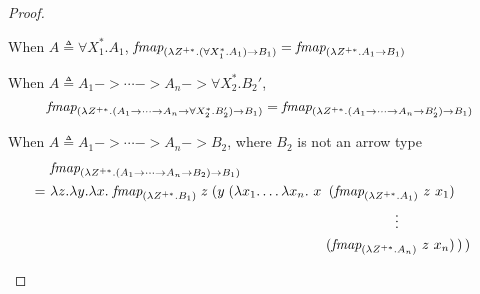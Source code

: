\begin{proof}
\begin{itemize}
	When $A \triangleq \forall X_1^{*}.A_1$,
	$\textit{fmap}_{(\lambda Z^{+*}.(\forall X_1^{*}.A_1) -> B_1)}
	= \textit{fmap}_{(\lambda Z^{+*}.A_1 -> B_1)}$

	\begin{singlespace}
	When $A \triangleq A_1 -> \cdots -> A_n -> \forall X_2^{*}.B_2'$,
	\vspace{-1.5ex}
	\[\textit{fmap}_{(\lambda Z^{+*}.(A_1 -> \cdots -> A_n -> \forall X_2^{*}.B_2') -> B_1)}
	= \textit{fmap}_{(\lambda Z^{+*}.(A_1 -> \cdots -> A_n -> B_2') -> B_1)} \]

	When $A \triangleq A_1 -> \cdots -> A_n -> B_2$,
	where $B_2$ is not an arrow type
	\vspace{-1.5ex}
	\begin{align*}
	  & \textit{fmap}_{(\l Z^{+*}.(A_1 -> \cdots -> A_n -> B_2) -> B_1)} \\
	=~& \l z.\l y. \l x.\;
	\textit{fmap}_{(\l Z^{+*}.B_1)} \; z \;
		(y \; (\l x_1.\ldots\l x_n. ~
		   x  &\!\!\!\!(\textit{fmap}_{(\l Z^{+*}.A_1)} ~ z ~ x_1)& \\
		     &&\!\!\!\!\vdots \qquad\qquad& \\
		     &&\!\!\!\!(\textit{fmap}_{(\l Z^{+*}.A_n)} ~ z ~ x_n)&
		\,) \,)
	\end{align*}
	\end{singlespace}

\end{itemize}
\end{proof}

